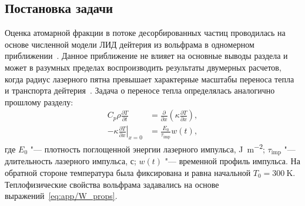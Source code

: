 \subsection{Постановка задачи}\label{subsec:ch4/seс2/subsec1}
Оценка атомарной фракции в потоке десорбированных частиц проводилась на основе численной модели ЛИД дейтерия из вольфрама в одномерном приближении~\cite{Kulagin2023}. Данное приближение не влияет на основные выводы раздела и может в разумных пределах воспроизводить результаты двумерных расчетов, когда радиус лазерного пятна превышает характерные масштабы переноса тепла и транспорта дейтерия~\cite{Stepanenko2024}. Задача о переносе тепла определялась аналогично прошлому разделу:
\begin{subequations}
    \label{eq:ch4/LID_heat_equation}
    \begin{align}
        C_p \rho \frac{\partial T}{\partial t}                         & = \frac{\partial}{\partial x}\left( \kappa \frac{\partial T}{\partial x} \right), \\
        -\kappa \left. \frac{\partial T}{\partial x} \right\vert_{x=0} & = \frac{E_0}{\tau_\mathrm{imp}} w(t),
    \end{align}
\end{subequations}
где \( E_0 \) "--- плотность поглощенной энергии лазерного импульса, \si{\joule\per\meter\squared}; \( \tau_\mathrm{imp} \) "--- длительность лазерного импульса, с; \(w(t) \) "--- временной профиль импульса. На обратной стороне температура была фиксирована и равна начальной \(T_0=\SI{300}{\kelvin}\). Теплофизические свойства вольфрама задавались на основе выражений~\cref{eq:app/W_props}.


